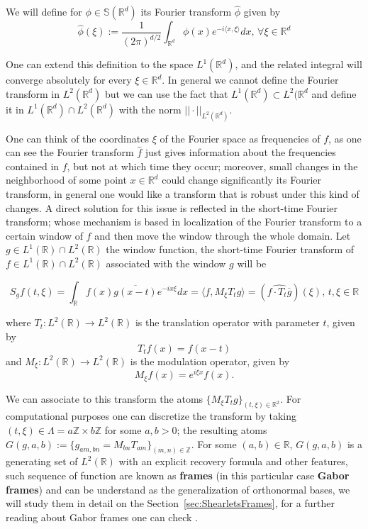 We will define for $\phi\in\mathbb{S}(\mathbb{R}^d)$ its Fourier transform $\hat{\phi}$ given by
$$
\hat{\phi}(\xi) := \frac{1}{(2\pi)^{d/2}}\int_{\mathbb{R}^d}\phi(x)e^{-i\langle x,\xi\rangle}dx\text{,  }\forall \xi\in\mathbb{R}^d
$$

One can extend this definition to the space $L^1(\mathbb{R}^d)$, and the related integral will converge absolutely for every $\xi\in\mathbb{R}^d$. In general we cannot define the Fourier transform in $L^2(\mathbb{R}^d)$ but we can use the fact that $L^1(\mathbb{R}^d)\subset L^2(\mathbb{R}^d$ and define it in $L^1(\mathbb{R}^d)\cap L^2(\mathbb{R}^d)$ with the norm $||\cdot||_{L^2(\mathbb{R}^d)}$. 

One can think of the coordinates $\xi$ of the Fourier space as frequencies of $f$, as one can see the Fourier transform $\hat{f}$ just gives information about the frequencies contained in $f$, but not at which time they occur; moreover, small changes in the neighborhood of some point $x\in\mathbb{R}^d$ could change significantly its Fourier transform, in general one would like a transform that is robust under this kind of changes. A direct solution for this issue is reflected in the short-time Fourier transform; whose mechanism is based in localization of the Fourier transform to a certain window of $f$ and then move the window through the whole domain. Let $g\in L^1(\mathbb{R})\cap L^2(\mathbb{R})$ the window function, the short-time Fourier transform of $f\in L^1(\mathbb{R})\cap L^2(\mathbb{R})$ associated with the window $g$ will be

$$
S_gf(t,\xi)=\int_{\mathbb{R}} f(x)\overline{g(x-t)}e^{-ix\xi}dx=\langle f,M_{\xi}T_tg\rangle = (\widehat{f\cdot T_t\overline{g}})(\xi)\text{,  } t,\xi\in\mathbb{R}
$$

where $T_t:L^2(\mathbb{R})\longrightarrow L^2(\mathbb{R})$ is the translation operator with parameter $t$, given by 
$$
T_tf(x)=f(x-t)
$$
and $M_{\xi}:L^2(\mathbb{R})\longrightarrow L^2(\mathbb{R})$ is the modulation operator, given by 
$$
M_{\xi} f(x)=e^{i\xi x}f(x).
$$

\bigskip 

We can associate to this transform the atoms $\{M_{\xi}T_tg\}_{(t,\xi)\in\mathbb{R}^2}$. For computational purposes one can discretize the transform by taking $(t,\xi)\in\Lambda=a\mathbb{Z}\times b\mathbb{Z}$ for some $a,b>0$; the resulting atoms $G(g,a,b):=\{g_{am,bn}=M_{bn}T_{am}\}_{(m,n)\in\mathbb{Z}}$. For some $(a,b)\in\mathbb{R}$, $G(g,a,b)$ is a generating set of $L^2(\mathbb{R})$ with an explicit recovery formula and other features, such sequence of function are known as \textbf{frames} (in this particular case \textbf{Gabor frames}) and can be understand as the generalization of orthonormal bases, we will study them in detail on the Section~\ref{sec:ShearletsFrames}, for a further reading about Gabor frames one can check \cite{Gabor}.

